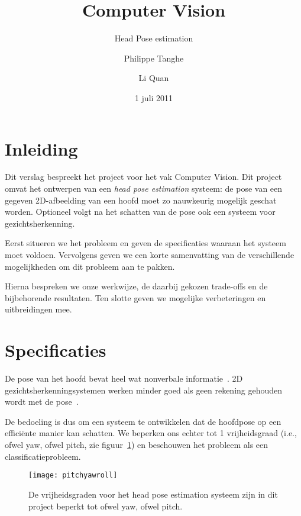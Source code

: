 \documentclass[a4paper,dutch,11pt]{scrartcl}
\title{Computer Vision}
\subtitle{Head Pose estimation}
\author{Philippe Tanghe \and Li Quan}
\date{1 juli 2011}
\begin{document}
\maketitle


{\small
\tableofcontents}

\clearpage
\section{Inleiding}
Dit verslag bespreekt het project voor het vak Computer Vision. Dit project omvat het ontwerpen van een \emph{head pose estimation} systeem: de pose van een gegeven 2D-afbeelding van een hoofd moet zo nauwkeurig mogelijk geschat worden. Optioneel volgt na het schatten van de pose ook een systeem voor gezichtsherkenning. 

Eerst situeren we het probleem en geven de specificaties waaraan het systeem moet voldoen. 
Vervolgens geven we een korte samenvatting van de verschillende mogelijkheden om dit probleem aan te pakken. 

Hierna bespreken we onze werkwijze, de daarbij gekozen trade-offs en de bijbehorende resultaten. 
Ten slotte geven we mogelijke verbeteringen en uitbreidingen mee.

\section{Specificaties}
De pose van het hoofd bevat heel wat nonverbale informatie~\cite{nonverbal2,nonverbal}. 2D gezichtsherkenningsystemen werken minder goed als geen rekening gehouden wordt met de pose~\cite{overview,facerec}. 

De bedoeling is dus om een systeem te ontwikkelen dat de hoofdpose op een effici\"ente manier kan schatten. We beperken ons echter tot 1 vrijheidsgraad (i.e., ofwel yaw, ofwel pitch, zie figuur~\ref{fig:pitchyawroll}) en beschouwen het probleem als een classificatieprobleem.

\begin{figure}[hbpt] \centering
 \texttt{[image: pitchyawroll]}
 \caption{De vrijheidsgraden voor het head pose estimation systeem zijn in dit project beperkt tot ofwel yaw, ofwel pitch. \cite{overview}}
 \label{fig:pitchyawroll}
\end{figure}
\end{document}
